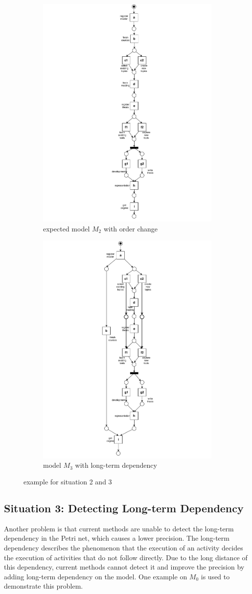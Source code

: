 \begin{figure}[htp]
	\centering
	\begin{subfigure}[b]{0.5\textwidth}
		\centering
		\includegraphics[clip, trim=8cm 0cm 8cm 0cm, width=0.5\linewidth, height=0.7\textheight]{figures/introduction/Master-change-order.pdf}
		\caption{expected model $M_{2}$ with order change}
		\label{fig:model_c}
	\end{subfigure}%
	\begin{subfigure}[b]{0.5\textwidth}
		\centering
		\includegraphics[clip, trim=7cm 0cm 7cm 0cm, width=0.5\linewidth, height=0.7\textheight]{figures/introduction/Master-with-lt.pdf}
		\caption{model $M_{3}$ with long-term dependency}
		\label{fig:model_d}
	\end{subfigure}
	\caption{example for situation 2 and 3}
	\label{fig:model_changes_2_3}
\end{figure}
\subsection{Situation 3: \small{Detecting Long-term Dependency}}
Another problem is that current methods are unable to detect the long-term dependency in the Petri net, which causes a lower precision. The long-term dependency describes the phenomenon that the execution of an activity decides the execution of activities that do not follow directly. Due to the long distance of this dependency, current methods cannot detect it and improve the precision by adding long-term dependency on the model. One example  on $M_0$ is used to demonstrate this problem.
 

